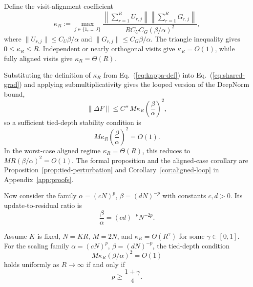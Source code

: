 \documentclass[11pt]{airesearch}
\begin{document}
Define the visit-alignment coefficient
\begin{equation}
  \kappa_R
  :=
  \max_{j\in\{1,\ldots,J\}}
  \frac{
    \left\|\sum_{r=1}^{R} U_{r,j}\right\|
    \left\|\sum_{r=1}^{R} G_{r,j}\right\|
  }{
    R C_U C_G(\beta/\alpha)^2
  },
  \label{eq:kappa-def}
\end{equation}
where $\|U_{r,j}\|\le C_U\beta/\alpha$ and
$\|G_{r,j}\|\le C_G\beta/\alpha$. The triangle inequality gives
$0\le\kappa_R\le R$. Independent or nearly orthogonal visits give
$\kappa_R=O(1)$, while fully aligned visits give $\kappa_R=\Theta(R)$.

Substituting the definition of $\kappa_R$ from Eq.~(\ref{eq:kappa-def}) into
Eq.~(\ref{eq:shared-grad}) and applying submultiplicativity gives the looped
version of the DeepNorm bound,
\begin{equation}
  \|\Delta F\|
  \le
  C''\,M\kappa_R\left(\frac{\beta}{\alpha}\right)^2,
  \label{eq:loop-update-bound}
\end{equation}
so a sufficient tied-depth stability condition is
\begin{equation}
  M\kappa_R\left(\frac{\beta}{\alpha}\right)^2 = O(1).
  \label{eq:loop-condition}
\end{equation}
In the worst-case aligned regime $\kappa_R=\Theta(R)$, this reduces to
$MR(\beta/\alpha)^2=O(1)$. The formal proposition and the aligned-case
corollary are Proposition~\ref{prop:tied-perturbation} and
Corollary~\ref{cor:aligned-loop} in Appendix~\ref{app:proofs}.

Now consider the family $\alpha=(cN)^p$, $\beta=(dN)^{-p}$ with constants
$c,d>0$. Its update-to-residual ratio is
\begin{equation}
  \frac{\beta}{\alpha}
  =
  (cd)^{-p}N^{-2p}.
  \label{eq:beta-over-alpha}
\end{equation}

\begin{proposition}
\label{prop:exponent-threshold}
Assume $K$ is fixed, $N=KR$, $M=2N$, and
$\kappa_R=\Theta(R^\gamma)$ for some $\gamma\in[0,1]$. For the scaling family
$\alpha=(cN)^p$, $\beta=(dN)^{-p}$, the tied-depth condition
\[
  M\kappa_R(\beta/\alpha)^2=O(1)
\]
holds uniformly as $R\to\infty$ if and only if
\[
  p\ge \frac{1+\gamma}{4}.
\]
\end{proposition}
\end{document}
